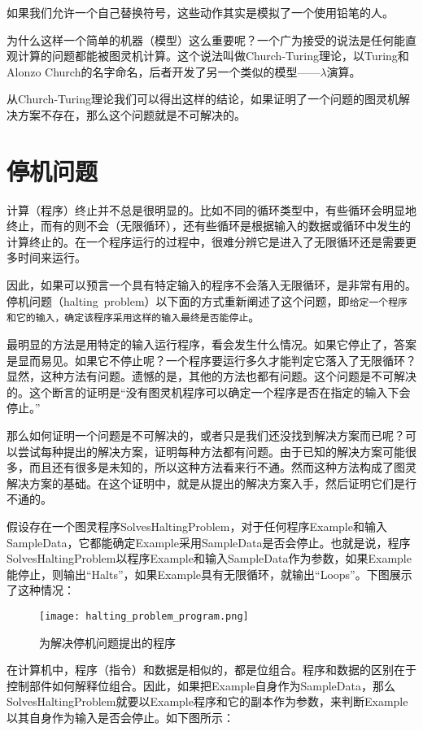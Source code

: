 如果我们允许一个自己替换符号，这些动作其实是模拟了一个使用铅笔的人。

为什么这样一个简单的机器（模型）这么重要呢？一个广为接受的说法是任何能直观计算的问题都能被图灵机计算。这个说法叫做Church-Turing理论，以Turing和Alonzo Church的名字命名，后者开发了另一个类似的模型——$\lambda$演算。

从Church-Turing理论我们可以得出这样的结论，如果证明了一个问题的图灵机解决方案不存在，那么这个问题就是不可解决的。


\chapter{停机问题}

计算（程序）终止并不总是很明显的。比如不同的循环类型中，有些循环会明显地终止，而有的则不会（无限循环），还有些循环是根据输入的数据或循环中发生的计算终止的。在一个程序运行的过程中，很难分辨它是进入了无限循环还是需要更多时间来运行。

因此，如果可以预言一个具有特定输入的程序不会落入无限循环，是非常有用的。停机问题（halting~problem）以下面的方式重新阐述了这个问题，即\verb|给定一个程序和它的输入，确定该程序采用这样的输入最终是否能停止|。

最明显的方法是用特定的输入运行程序，看会发生什么情况。如果它停止了，答案是显而易见。如果它不停止呢？一个程序要运行多久才能判定它落入了无限循环？显然，这种方法有问题。遗憾的是，其他的方法也都有问题。这个问题是不可解决的。这个断言的证明是“没有图灵机程序可以确定一个程序是否在指定的输入下会停止。”

那么如何证明一个问题是不可解决的，或者只是我们还没找到解决方案而已呢？可以尝试每种提出的解决方案，证明每种方法都有问题。由于已知的解决方案可能很多，而且还有很多是未知的，所以这种方法看来行不通。然而这种方法构成了图灵解决方案的基础。在这个证明中，就是从提出的解决方案入手，然后证明它们是行不通的。

假设存在一个图灵程序SolvesHaltingProblem，对于任何程序Example和输入SampleData，它都能确定Example采用SampleData是否会停止。也就是说，程序SolvesHaltingProblem以程序Example和输入SampleData作为参数，如果Example能停止，则输出“Halts”，如果Example具有无限循环，就输出“Loops”。下图展示了这种情况：

\begin{figure}[!h]
\centering
\texttt{[image: halting\_problem\_program.png]}
\caption{为解决停机问题提出的程序}
\end{figure}

在计算机中，程序（指令）和数据是相似的，都是位组合。程序和数据的区别在于控制部件如何解释位组合。因此，如果把Example自身作为SampleData，那么SolvesHaltingProblem就要以Example程序和它的副本作为参数，来判断Example以其自身作为输入是否会停止。如下图所示：

